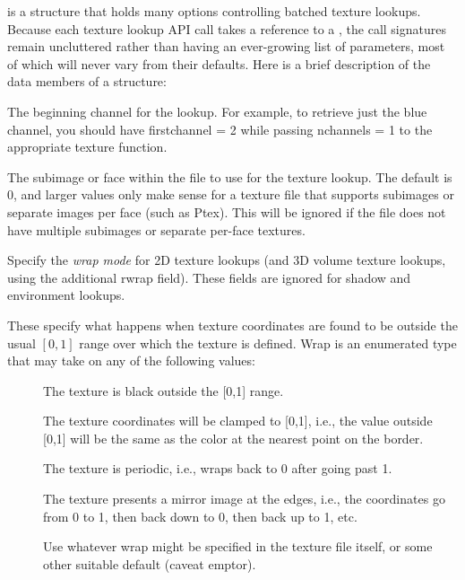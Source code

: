 \TextureOptions is a structure that holds many options controlling
batched texture lookups.  Because each texture lookup API call takes
a reference to a \TextureOptions, the call signatures remain uncluttered
rather than having an ever-growing list of parameters, most of which
will never vary from their defaults.  Here is a brief description of
the data members of a \TextureOptions structure:

The beginning channel for the lookup.  For example, to retrieve just the blue
channel, you should have {\cf firstchannel} = 2 while passing {\cf nchannels} = 1
to the appropriate texture function.
\apiend

The subimage or face within the file to use for the texture lookup.
The default is 0, and larger values only make sense for a texture file
that supports subimages or separate images per face (such as Ptex).
This will be ignored if the file does not have multiple subimages or
separate per-face textures.
\apiend

Specify the \emph{wrap mode} for 2D texture lookups (and 3D volume
texture lookups, using the additional {\cf rwrap} field).  These fields
are ignored for shadow and environment lookups.

These specify what happens when texture coordinates are found to be
outside the usual $[0,1]$ range over which the texture is defined.
{\cf Wrap} is an enumerated type that may take on any of the
following values:
\begin{description}
\item[\spc] \spc
\item[\rm {}] The texture is black outside the [0,1] range.
\item[\rm {}] The texture coordinates will be clamped to
  [0,1], i.e., the value outside [0,1] will be the same as the color
  at the nearest point on the border.
\item[\rm {}] The texture is periodic, i.e., wraps back
  to 0 after going past 1.
\item[\rm {}] The texture presents a mirror image at the
  edges, i.e., the coordinates go from 0 to 1, then back down to 0, then
  back up to 1, etc.
\item[\rm {}] Use whatever wrap might be specified in the
  texture file itself, or some other suitable default (caveat emptor).
\end{description}

